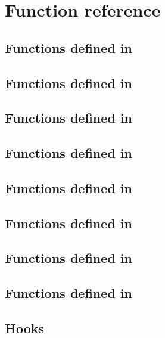 \chapter{Function reference}
\label{sec:exports}

\section{Functions defined in }
\label{sec:ioncoreref}


\section{Functions defined in }
\label{sec:tilingref}


%

\section{Functions defined in }
\label{sec:queryref}


\section{Functions defined in }
\label{sec:menuref}


\section{Functions defined in }
\label{sec:dockref}


\section{Functions defined in }
\label{sec:spref}


\section{Functions defined in }
\label{sec:statusbarref}


\section{Functions defined in }
\label{sec:deref}


\section{Hooks}
\label{sec:hookref}

